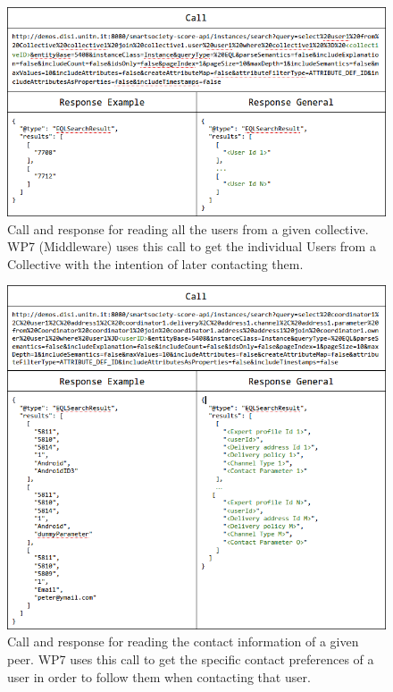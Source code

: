 \begin{figure}[htb!]
\centering
\includegraphics[width=1\linewidth]{figures/Collective-read.png}
\caption{Call and response for reading all the users from a given collective. WP7 (Middleware) uses this call to get the individual Users from a Collective with the intention of later contacting them.}
\label{fig:Collective-read}
\end{figure}

\begin{figure}[htb!]
\centering
\includegraphics[width=1\linewidth]{figures/Peer-read.png}
\caption{Call and response for reading the contact information of a given peer. WP7 uses this call to get the specific contact preferences of a user in order to follow them when contacting that user.}
\label{fig:Peer-read}
\end{figure}